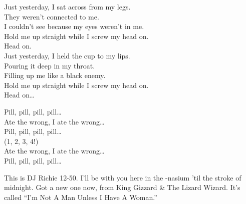 
\label{album:float-along-fill-your-lungs}






Just yesterday, I sat across from my legs. \\
They weren't connected to me. \\
I couldn't see because my eyes weren't in me. \\
Hold me up straight while I screw my head on. \\

Head on. \\

Just yesterday, I held the cup to my lips. \\
Pouring it deep in my throat. \\
Filling up me like a black enemy. \\
Hold me up straight while I screw my head on. \\

Head on… \\


Pill, pill, pill, pill… \\

Ate the wrong, I ate the wrong… \\

Pill, pill, pill, pill… \\

(1, 2, 3, 4!) \\

Ate the wrong, I ate the wrong… \\

Pill, pill, pill, pill… \\





This is DJ Richie 12-50. I'll be with you here in the -nasium 'til the stroke of midnight. Got a new one now, from King Gizzard \& The Lizard Wizard. It's called ``I'm Not A Man Unless I Have A Woman.'' \\

